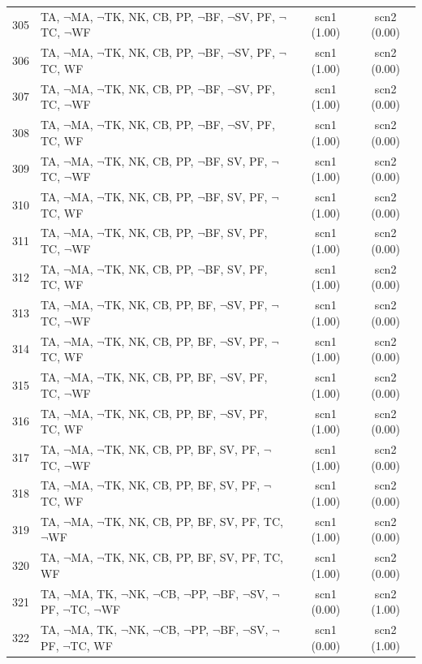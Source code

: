 \documentclass[12pt]{article}
\begin{document}
\begin{longtable}{|l|l|c|c|}
305 & TA, $\neg$MA, $\neg$TK, NK, CB, PP, $\neg$BF, $\neg$SV, PF, $\neg$TC, $\neg$WF & scn1 (1.00) & scn2 (0.00)\\
306 & TA, $\neg$MA, $\neg$TK, NK, CB, PP, $\neg$BF, $\neg$SV, PF, $\neg$TC, WF & scn1 (1.00) & scn2 (0.00)\\
307 & TA, $\neg$MA, $\neg$TK, NK, CB, PP, $\neg$BF, $\neg$SV, PF, TC, $\neg$WF & scn1 (1.00) & scn2 (0.00)\\
308 & TA, $\neg$MA, $\neg$TK, NK, CB, PP, $\neg$BF, $\neg$SV, PF, TC, WF & scn1 (1.00) & scn2 (0.00)\\
309 & TA, $\neg$MA, $\neg$TK, NK, CB, PP, $\neg$BF, SV, PF, $\neg$TC, $\neg$WF & scn1 (1.00) & scn2 (0.00)\\
310 & TA, $\neg$MA, $\neg$TK, NK, CB, PP, $\neg$BF, SV, PF, $\neg$TC, WF & scn1 (1.00) & scn2 (0.00)\\
311 & TA, $\neg$MA, $\neg$TK, NK, CB, PP, $\neg$BF, SV, PF, TC, $\neg$WF & scn1 (1.00) & scn2 (0.00)\\
312 & TA, $\neg$MA, $\neg$TK, NK, CB, PP, $\neg$BF, SV, PF, TC, WF & scn1 (1.00) & scn2 (0.00)\\
313 & TA, $\neg$MA, $\neg$TK, NK, CB, PP, BF, $\neg$SV, PF, $\neg$TC, $\neg$WF & scn1 (1.00) & scn2 (0.00)\\
314 & TA, $\neg$MA, $\neg$TK, NK, CB, PP, BF, $\neg$SV, PF, $\neg$TC, WF & scn1 (1.00) & scn2 (0.00)\\
315 & TA, $\neg$MA, $\neg$TK, NK, CB, PP, BF, $\neg$SV, PF, TC, $\neg$WF & scn1 (1.00) & scn2 (0.00)\\
316 & TA, $\neg$MA, $\neg$TK, NK, CB, PP, BF, $\neg$SV, PF, TC, WF & scn1 (1.00) & scn2 (0.00)\\
317 & TA, $\neg$MA, $\neg$TK, NK, CB, PP, BF, SV, PF, $\neg$TC, $\neg$WF & scn1 (1.00) & scn2 (0.00)\\
318 & TA, $\neg$MA, $\neg$TK, NK, CB, PP, BF, SV, PF, $\neg$TC, WF & scn1 (1.00) & scn2 (0.00)\\
319 & TA, $\neg$MA, $\neg$TK, NK, CB, PP, BF, SV, PF, TC, $\neg$WF & scn1 (1.00) & scn2 (0.00)\\
320 & TA, $\neg$MA, $\neg$TK, NK, CB, PP, BF, SV, PF, TC, WF & scn1 (1.00) & scn2 (0.00)\\
321 & TA, $\neg$MA, TK, $\neg$NK, $\neg$CB, $\neg$PP, $\neg$BF, $\neg$SV, $\neg$PF, $\neg$TC, $\neg$WF & scn1 (0.00) & scn2 (1.00)\\
322 & TA, $\neg$MA, TK, $\neg$NK, $\neg$CB, $\neg$PP, $\neg$BF, $\neg$SV, $\neg$PF, $\neg$TC, WF & scn1 (0.00) & scn2 (1.00)\\

\end{longtable}
\end{document}

